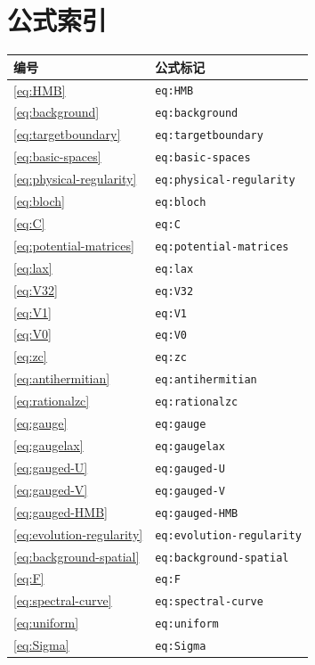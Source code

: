 \clearpage
\section*{公式索引}
\begingroup\sloppy
\begin{longtable}{p{}p{}}
\toprule 编号 & 公式标记\\\midrule\endhead
\eqref{eq:HMB} & \texttt{eq:HMB}\\
\eqref{eq:background} & \texttt{eq:background}\\
\eqref{eq:targetboundary} & \texttt{eq:targetboundary}\\
\eqref{eq:basic-spaces} & \texttt{eq:basic-spaces}\\
\eqref{eq:physical-regularity} & \texttt{eq:physical-regularity}\\
\eqref{eq:bloch} & \texttt{eq:bloch}\\
\eqref{eq:C} & \texttt{eq:C}\\
\eqref{eq:potential-matrices} & \texttt{eq:potential-matrices}\\
\eqref{eq:lax} & \texttt{eq:lax}\\
\eqref{eq:V32} & \texttt{eq:V32}\\
\eqref{eq:V1} & \texttt{eq:V1}\\
\eqref{eq:V0} & \texttt{eq:V0}\\
\eqref{eq:zc} & \texttt{eq:zc}\\
\eqref{eq:antihermitian} & \texttt{eq:antihermitian}\\
\eqref{eq:rationalzc} & \texttt{eq:rationalzc}\\
\eqref{eq:gauge} & \texttt{eq:gauge}\\
\eqref{eq:gaugelax} & \texttt{eq:gaugelax}\\
\eqref{eq:gauged-U} & \texttt{eq:gauged-U}\\
\eqref{eq:gauged-V} & \texttt{eq:gauged-V}\\
\eqref{eq:gauged-HMB} & \texttt{eq:gauged-HMB}\\
\eqref{eq:evolution-regularity} & \texttt{eq:evolution-regularity}\\
\eqref{eq:background-spatial} & \texttt{eq:background-spatial}\\
\eqref{eq:F} & \texttt{eq:F}\\
\eqref{eq:spectral-curve} & \texttt{eq:spectral-curve}\\
\eqref{eq:uniform} & \texttt{eq:uniform}\\
\eqref{eq:Sigma} & \texttt{eq:Sigma}\\

\end{longtable}
